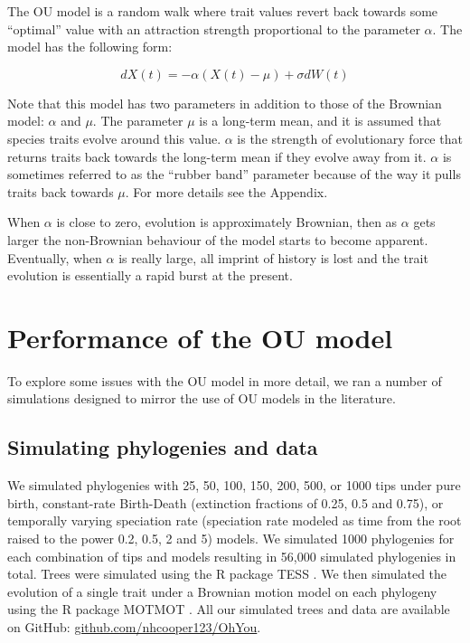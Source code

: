 \documentclass[a4paper,12pt]{article}
\begin{document}
   The OU model \citep{hansen1997stabilizing,Butler:2004aa} is a random walk where trait values revert back towards some ``optimal'' value with an attraction strength proportional to the parameter $\alpha$. 
    The model has the following form:
  
      \begin{equation}
        dX(t) = - \alpha (X(t) - \mu) + \sigma dW(t)
      \end{equation}
    
    \noindent
    Note that this model has two parameters in addition to those of the Brownian model: $\alpha$ and $\mu$. 
    The parameter $\mu$ is a long-term mean, and it is assumed that species traits evolve around this value. 
    $\alpha$ is the strength of evolutionary force that returns traits back towards the long-term mean if they evolve away from it. 
    $\alpha$ is sometimes referred to as the ``rubber band'' parameter because of the way it pulls traits back towards $\mu$. For more details see the Appendix.
    
    When $\alpha$ is close to zero, evolution is approximately Brownian, then as $\alpha$ gets larger the non-Brownian behaviour of the model starts to become apparent. 
    Eventually, when $\alpha$ is really large, all imprint of history is lost and the trait evolution is essentially a rapid burst at the present.
  
\section{Performance of the OU model}

  To explore some issues with the OU model in more detail, we ran a number of simulations designed to mirror the use of OU models in the literature.

  \subsection{Simulating phylogenies and data}
    We simulated phylogenies with 25, 50, 100, 150, 200, 500, or 1000 tips under pure birth, constant-rate Birth-Death (extinction fractions of 0.25, 0.5 and 0.75), or temporally varying speciation rate (speciation rate modeled as time from the root raised to the power 0.2, 0.5, 2 and 5) models. 
    We simulated 1000 phylogenies for each combination of tips and models resulting in 56,000 simulated phylogenies in total. 
    Trees were simulated using the R package TESS \cite{hohna2013fast}. 
    We then simulated the evolution of a single trait under a Brownian motion model on each phylogeny using the R package MOTMOT \citep{Thomas:2011aa}. 
    All our simulated trees and data are available on GitHub: \href{https://github.com/nhcooper123/OhYou}{github.com/nhcooper123/OhYou}.
\end{document}
